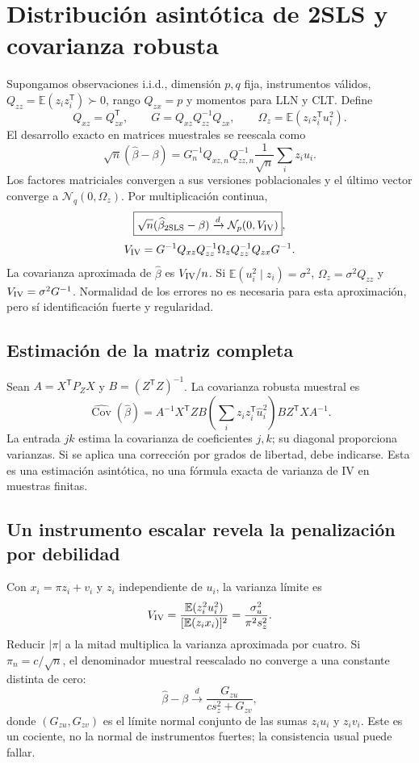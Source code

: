 \documentclass[11pt,a4paper]{article}
\newcommand{\E}{\mathbb E}
\newcommand{\T}{^{\mathsf T}}
\DeclareMathOperator{\Cov}{Cov}
\theoremstyle{definition}
\begin{document}
\section{Distribución asintótica de 2SLS y covarianza robusta}
Supongamos observaciones i.i.d., dimensión $p,q$ fija, instrumentos válidos, $Q_{zz}=\E(z_iz_i\T)\succ0$, rango $Q_{zx}=p$ y momentos para LLN y CLT. Define
\[
Q_{xz}=Q_{zx}\T,\qquad G=Q_{xz}Q_{zz}^{-1}Q_{zx},\qquad
\Omega_z=\E(z_iz_i\T u_i^2).
\]
El desarrollo exacto en matrices muestrales se reescala como
\[
\sqrt n(\widehat\beta-\beta)=G_n^{-1}Q_{xz,n}Q_{zz,n}^{-1}
\frac1{\sqrt n}\sum_i z_iu_i.
\]
Los factores matriciales convergen a sus versiones poblacionales y el último vector converge a $\mathcal N_q(0,\Omega_z)$. Por multiplicación continua,
\[
\boxed{\sqrt n(\widehat\beta_{\rm 2SLS}-\beta)\xrightarrow d
\mathcal N_p(0,V_{\rm IV})},
\]
\[
V_{\rm IV}=G^{-1}Q_{xz}Q_{zz}^{-1}\Omega_zQ_{zz}^{-1}Q_{zx}G^{-1}.
\]
La covarianza aproximada de $\widehat\beta$ es $V_{\rm IV}/n$. Si $\E(u_i^2\mid z_i)=\sigma^2$, $\Omega_z=\sigma^2Q_{zz}$ y $V_{\rm IV}=\sigma^2G^{-1}$. Normalidad de los errores no es necesaria para esta aproximación, pero sí identificación fuerte y regularidad.
\subsection{Estimación de la matriz completa}
Sean $A=X\T P_ZX$ y $B=(Z\T Z)^{-1}$. La covarianza robusta muestral es
\[
\boxed{\widehat{\Cov}(\widehat\beta)=
A^{-1}X\T ZB\left(\sum_i z_iz_i\T\widehat u_i^2\right)BZ\T XA^{-1}}.
\]
La entrada $jk$ estima la covarianza de coeficientes $j,k$; su diagonal proporciona varianzas. Si se aplica una corrección por grados de libertad, debe indicarse. Esta es una estimación asintótica, no una fórmula exacta de varianza de IV en muestras finitas.
\subsection{Un instrumento escalar revela la penalización por debilidad}
Con $x_i=\pi z_i+v_i$ y $z_i$ independiente de $u_i$, la varianza límite es
\[
V_{\rm IV}=\frac{\E(z_i^2u_i^2)}{[\E(z_ix_i)]^2}
=\frac{\sigma_u^2}{\pi^2s_z^2}.
\]
Reducir $|\pi|$ a la mitad multiplica la varianza aproximada por cuatro. Si $\pi_n=c/\sqrt n$, el denominador muestral reescalado no converge a una constante distinta de cero:
\[
\widehat\beta-\beta\xrightarrow d
\frac{G_{zu}}{c s_z^2+G_{zv}},
\]
donde $(G_{zu},G_{zv})$ es el límite normal conjunto de las sumas $z_iu_i$ y $z_iv_i$. Este es un cociente, no la normal de instrumentos fuertes; la consistencia usual puede fallar.
\end{document}
